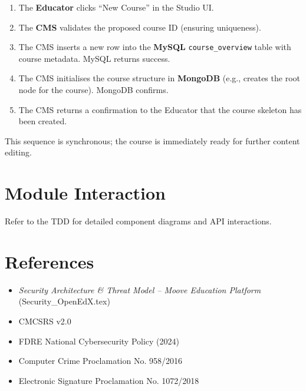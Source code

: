 \begin{enumerate}
    \item The \textbf{Educator} clicks “New Course” in the Studio UI.
    \item The \textbf{CMS} validates the proposed course ID (ensuring uniqueness).
    \item The CMS inserts a new row into the \textbf{MySQL} \texttt{course\_overview} table with course metadata. MySQL returns success.
    \item The CMS initialises the course structure in \textbf{MongoDB} (e.g., creates the root node for the course). MongoDB confirms.
    \item The CMS returns a confirmation to the Educator that the course skeleton has been created.
\end{enumerate}

This sequence is synchronous; the course is immediately ready for further content editing.

\section{Module Interaction}
Refer to the TDD for detailed component diagrams and API interactions.

\section{References}
\begin{itemize}
    \item \textit{Security Architecture \& Threat Model – Moove Education Platform} (Security\_OpenEdX.tex)
    \item CMCSRS v2.0
    \item FDRE National Cybersecurity Policy (2024)
    \item Computer Crime Proclamation No. 958/2016
    \item Electronic Signature Proclamation No. 1072/2018
\end{itemize}


